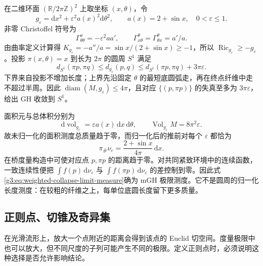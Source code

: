 \begin{example}\label{g3:exm:weighted-circle-collapse}
	在二维环面 \((\mathbb R/2\pi\mathbb Z)^2\) 上取坐标 \((x,\theta)\)，令
	\[
		g_\varepsilon=\mathrm dx^2+\varepsilon^2a(x)^2\mathrm d\theta^2,
		\qquad a(x)=2+\sin x,\quad 0<\varepsilon\le1.
	\]
	非零 Christoffel 符号为
	\[
		\Gamma^x_{\theta\theta}=-\varepsilon^2aa',
		\qquad \Gamma^\theta_{x\theta}=
		\Gamma^\theta_{\theta x}=a'/a.
	\]
	由曲率定义计算得 \(K_{g_\varepsilon}=-a''/a=\sin x/(2+\sin x)\ge-1\)，所以 \(\operatorname{Ric}_{g_\varepsilon}\ge-g_\varepsilon\)。投影 \(\pi(x,\theta)=x\) 到长为 \(2\pi\) 的圆周 \(S^1\) 满足
	\[
		d_{S^1}(\pi p,\pi q)\le d_{g_\varepsilon}(p,q)
		\le d_{S^1}(\pi p,\pi q)+3\pi\varepsilon.
	\]
	下界来自投影不增加长度；上界先沿固定 \(\theta\) 的最短底圆弧走，再在终点纤维中走不超过半周。因此 \(\operatorname{diam}(M,g_\varepsilon)\le4\pi\)，且对应 \(\{(p,\pi p)\}\) 的失真至多为 \(3\pi\varepsilon\)，给出 GH 收敛到 \(S^1\)。

	面积元与总体积分别为
	\[
		\mathrm d\operatorname{vol}_{g_\varepsilon}
		=\varepsilon a(x)\,\mathrm dx\,\mathrm d\theta,
		\qquad \operatorname{Vol}_{g_\varepsilon}M=8\pi^2\varepsilon.
	\]
	故未归一化的面积测度总质量趋于零，而归一化后的推前对每个 \(\varepsilon\) 都恰为
	\begin{equation}\label{g3:eq:weighted-collapse-limit-measure}
		\pi_\#\nu_\varepsilon=
		\frac{2+\sin x}{4\pi}\,\mathrm dx.
	\end{equation}
	在桥度量构造中可使对应点 \(p,\pi p\) 的距离趋于零。对共同紧致环境中的连续函数，一致连续性便把 \(\int f(p)\,\mathrm d\nu_\varepsilon\) 与 \(\int f(\pi p)\,\mathrm d\nu_\varepsilon\) 的差控制到零。因此式\eqref{g3:eq:weighted-collapse-limit-measure}确为 mGH 极限测度。它不是圆周的归一化长度测度：在较粗的纤维之上，每单位底圆长度留下更多质量。
\end{example}

\subsection{正则点、切锥及奇异集}
\label{g3:subsec:2903:03}
在光滑流形上，放大一个点附近的距离会得到该点的 Euclid 切空间。度量极限中也可以放大，但不同尺度的子列可能产生不同的极限。定义正则点时，必须说明这种选择是否允许影响结论。

